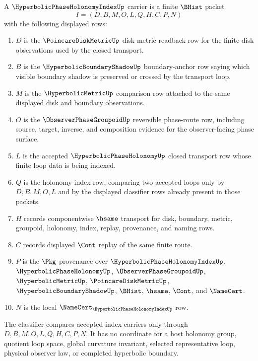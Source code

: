 \begin{definition}
\label{def:hyperbolic-phase-holonomy-index-carrier}
A $\HyperbolicPhaseHolonomyIndexUp$ carrier is a finite $\BHist$ packet
$$
I=(D,B,M,O,L,Q,H,C,P,N)
$$
with the following displayed rows:
\begin{enumerate}
  \item $D$ is the $\PoincareDiskMetricUp$ disk-metric readback row for the finite disk observations used by the closed transport.
  \item $B$ is the $\HyperbolicBoundaryShadowUp$ boundary-anchor row saying which visible boundary shadow is preserved or crossed by the transport loop.
  \item $M$ is the $\HyperbolicMetricUp$ comparison row attached to the same displayed disk and boundary observations.
  \item $O$ is the $\ObserverPhaseGroupoidUp$ reversible phase-route row, including source, target, inverse, and composition evidence for the observer-facing phase surface.
  \item $L$ is the accepted $\HyperbolicPhaseHolonomyUp$ closed transport row whose finite loop data is being indexed.
  \item $Q$ is the holonomy-index row, comparing two accepted loops only by $D,B,M,O,L$ and by the displayed classifier rows already present in those packets.
  \item $H$ records componentwise $\hsame$ transport for disk, boundary, metric, groupoid, holonomy, index, replay, provenance, and naming rows.
  \item $C$ records displayed $\Cont$ replay of the same finite route.
  \item $P$ is the $\Pkg$ provenance over $\HyperbolicPhaseHolonomyIndexUp$, $\HyperbolicPhaseHolonomyUp$, $\ObserverPhaseGroupoidUp$, $\HyperbolicMetricUp$, $\PoincareDiskMetricUp$, $\HyperbolicBoundaryShadowUp$, $\BHist$, $\hsame$, $\Cont$, and $\NameCert$.
  \item $N$ is the local $\NameCert_{\HyperbolicPhaseHolonomyIndexUp}$ row.
\end{enumerate}
The classifier compares accepted index carriers only through $D,B,M,O,L,Q,H,C,P,N$. It has no coordinate for a host holonomy group, quotient loop space, global curvature invariant, selected representative loop, physical observer law, or completed hyperbolic boundary.
\end{definition}

